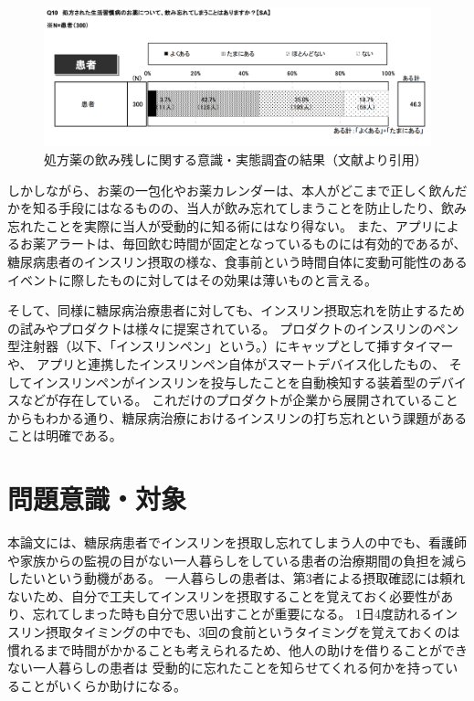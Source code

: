 \begin{figure}[htbp]
  \caption{処方薬の飲み残しに関する意識・実態調査の結果（文献\cite{drug_treatment_investigation}より引用）}
  \label{fig:forget_medicine_number}
  \begin{center}
    \includegraphics[bb=0 0 1000 400,width=15cm]{assets/forget_medicine_number.png}
  \end{center}
\end{figure}

しかしながら、お薬の一包化やお薬カレンダーは、本人がどこまで正しく飲んだかを知る手段にはなるものの、当人が飲み忘れてしまうことを防止したり、飲み忘れたことを実際に当人が受動的に知る術にはなり得ない。
また、アプリによるお薬アラートは、毎回飲む時間が固定となっているものには有効的であるが、糖尿病患者のインスリン摂取の様な、食事前という時間自体に変動可能性のあるイベントに際したものに対してはその効果は薄いものと言える。

そして、同様に糖尿病治療患者に対しても、インスリン摂取忘れを防止するための試みやプロダクトは様々に提案されている。
プロダクトのインスリンのペン型注射器（以下、「インスリンペン」という。）にキャップとして挿すタイマー\cite{timesulin}や、
アプリと連携したインスリンペン自体がスマートデバイス化したもの\cite{inpen}、
そしてインスリンペンがインスリンを投与したことを自動検知する装着型のデバイス\cite{insulcheck}などが存在している。
これだけのプロダクトが企業から展開されていることからもわかる通り、糖尿病治療におけるインスリンの打ち忘れという課題があることは明確である。

\section{問題意識・対象}

本論文には、糖尿病患者でインスリンを摂取し忘れてしまう人の中でも、看護師や家族からの監視の目がない一人暮らしをしている患者の治療期間の負担を減らしたいという動機がある。
一人暮らしの患者は、第3者による摂取確認には頼れないため、自分で工夫してインスリンを摂取することを覚えておく必要性があり、忘れてしまった時も自分で思い出すことが重要になる。
1日4度訪れるインスリン摂取タイミングの中でも、3回の食前というタイミングを覚えておくのは慣れるまで時間がかかることも考えられるため、他人の助けを借りることができない一人暮らしの患者は
受動的に忘れたことを知らせてくれる何かを持っていることがいくらか助けになる。

